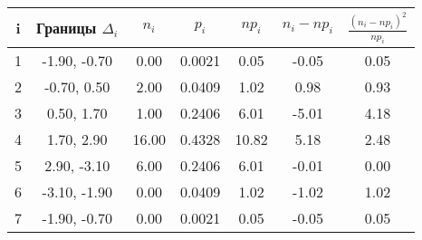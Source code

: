 \begin{tabular}{|c|c|c|c|c|c|c|}
\hline i & Границы $\Delta_i$ & $n_i$ & $p_i$ & $np_i$ & $n_i - np_i$ & $\frac{(n_i - np_i)^2}{np_i}$\\\hline
1 & -1.90, -0.70 & 0.00 & 0.0021 & 0.05 & -0.05 & 0.05\\
\hline
2 & -0.70, 0.50 & 2.00 & 0.0409 & 1.02 & 0.98 & 0.93\\
\hline
3 & 0.50, 1.70 & 1.00 & 0.2406 & 6.01 & -5.01 & 4.18\\
\hline
4 & 1.70, 2.90 & 16.00 & 0.4328 & 10.82 & 5.18 & 2.48\\
\hline
5 & 2.90, -3.10 & 6.00 & 0.2406 & 6.01 & -0.01 & 0.00\\
\hline
6 & -3.10, -1.90 & 0.00 & 0.0409 & 1.02 & -1.02 & 1.02\\
\hline
7 & -1.90, -0.70 & 0.00 & 0.0021 & 0.05 & -0.05 & 0.05\\
\hline
\end{tabular}

